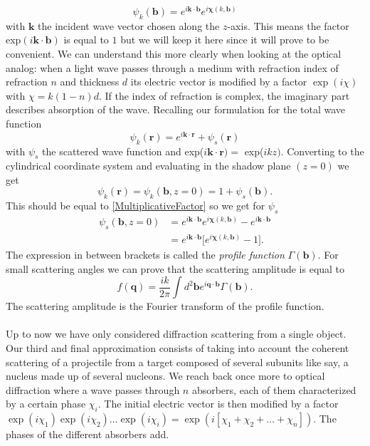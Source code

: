 \documentclass[11pt]{article}
\numberwithin{equation}{section}
\begin{document}
\begin{equation}\label{MultiplicativeFactor}
	\psi_k(\mathbf{b}) = e^{i\mathbf{k}\cdot \mathbf{b}} e^{i\mathbf{\chi}(k,\mathbf{b})}
\end{equation}
with $\mathbf{k}$ the incident wave vector chosen along the $z$-axis. This means the factor exp$(i\mathbf{k}\cdot\mathbf{b})$ is equal to $1$ but we will keep it here since it will prove to be convenient. We can understand this more clearly when looking at the optical analog: when a light wave passes through a medium with refraction index of refraction $n$ and thickness $d$ its electric vector is modified by a factor $\exp(i\chi)$ with $\chi = k(1-n)d$. If the index of refraction is complex, the imaginary part describes absorption of the wave. Recalling our formulation for the total wave function
\begin{equation}
	\psi_k(\mathbf{r}) = e^{i\mathbf{k}\cdot \mathbf{r}} + \psi_s(\mathbf{r})
\end{equation}
with $\psi_s$ the scattered wave function and exp($i\mathbf{k}\cdot \mathbf{r}) =$ exp($ikz)$. Converting to the cylindrical coordinate system and evaluating in the shadow plane $(z=0)$ we get
\begin{equation}
	\psi_k(\mathbf{r}) = \psi_k(\mathbf{b},z=0) = 1 + \psi_s(\mathbf{b}).
\end{equation}
This should be equal to \eqref{MultiplicativeFactor} so we get for $\psi_s$
\begin{align}
	\psi_s(\mathbf{b},z=0) &= e^{i\mathbf{k}\cdot \mathbf{b}} e^{i\mathbf{\chi}(k,\mathbf{b})} - e^{i\mathbf{k}\cdot\mathbf{b}}\\
&= e^{i\mathbf{k}\cdot\mathbf{b}}\lbrack e^{i\mathbf{\chi}(k,\mathbf{b})} - 1 \rbrack.
\end{align}
The expression in between brackets is called the \emph{profile function} $\Gamma(\mathbf{b})$. For small scattering angles we can prove that the scattering amplitude is equal to
\begin{equation}
	f(\mathbf{q}) = \frac{ik}{2\pi} \int d^2 \mathbf{b} e^{i \mathbf{q}\cdot \mathbf{b}} \Gamma(\mathbf{b}).
\end{equation}
The scattering amplitude is the Fourier transform of the profile function.\\ \\
Up to now we have only considered diffraction scattering from a single object. Our third and final approximation consists of taking into account the coherent scattering of a projectile from a target composed of several subunits like say, a nucleus made up of several nucleons. We reach back once more to optical diffraction where a wave passes through $n$ absorbers, each of them characterized by a certain phase $\chi_i$. The initial electric vector is then modified by a factor $\exp(i\chi_1)\exp(i\chi_2)\ldots\exp(i\chi_i) = \exp(i[\chi_1 + \chi_2 +\ldots + \chi_n])$. The phases of the different absorbers add.\\
\end{document}
